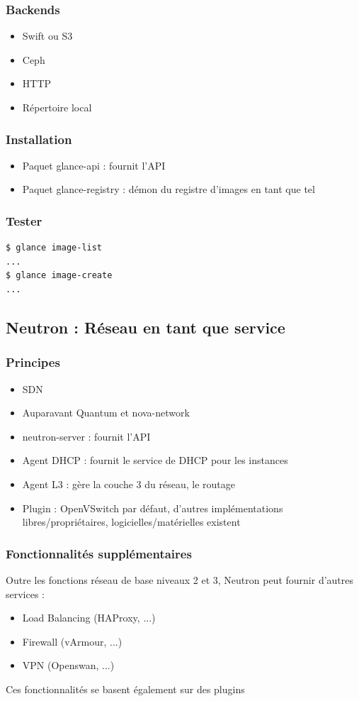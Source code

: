   \begin{frame}
    \frametitle{Backends}
    \begin{itemize}
      \item Swift ou S3
      \item Ceph
      \item HTTP
      \item Répertoire local
    \end{itemize}
  \end{frame}

  \begin{frame}
    \frametitle{Installation}
    \begin{itemize}
      \item Paquet glance-api : fournit l'API
      \item Paquet glance-registry : démon du registre d'images en tant que tel
    \end{itemize}
  \end{frame}

  \begin{frame}[containsverbatim]
    \frametitle{Tester}
\begin{verbatim}
$ glance image-list
...
$ glance image-create
...
\end{verbatim}
  \end{frame}

  \subsection[Neutron]{Neutron : Réseau en tant que service}

  \begin{frame}
    \frametitle{Principes}
    \begin{itemize}
      \item SDN
      \item Auparavant Quantum et nova-network
      \item neutron-server : fournit l'API
      \item Agent DHCP : fournit le service de DHCP pour les instances
      \item Agent L3 : gère la couche 3 du réseau, le routage
      \item Plugin : OpenVSwitch par défaut, d'autres implémentations libres/propriétaires, logicielles/matérielles existent
    \end{itemize}
  \end{frame}

  \begin{frame}
    \frametitle{Fonctionnalités supplémentaires}
    Outre les fonctions réseau de base niveaux 2 et 3, Neutron peut fournir d'autres services :
    \begin{itemize}
      \item Load Balancing (HAProxy, ...)
      \item Firewall (vArmour, ...)
      \item VPN (Openswan, ...)
    \end{itemize}
    Ces fonctionnalités se basent également sur des plugins
  \end{frame}

